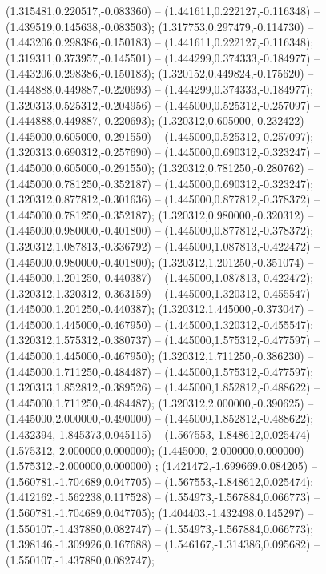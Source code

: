  (1.315481,0.220517,-0.083360) -- (1.441611,0.222127,-0.116348) -- (1.439519,0.145638,-0.083503);
 (1.317753,0.297479,-0.114730) -- (1.443206,0.298386,-0.150183) -- (1.441611,0.222127,-0.116348);
 (1.319311,0.373957,-0.145501) -- (1.444299,0.374333,-0.184977) -- (1.443206,0.298386,-0.150183);
 (1.320152,0.449824,-0.175620) -- (1.444888,0.449887,-0.220693) -- (1.444299,0.374333,-0.184977);
 (1.320313,0.525312,-0.204956) -- (1.445000,0.525312,-0.257097) -- (1.444888,0.449887,-0.220693);
 (1.320312,0.605000,-0.232422) -- (1.445000,0.605000,-0.291550) -- (1.445000,0.525312,-0.257097);
 (1.320313,0.690312,-0.257690) -- (1.445000,0.690312,-0.323247) -- (1.445000,0.605000,-0.291550);
 (1.320312,0.781250,-0.280762) -- (1.445000,0.781250,-0.352187) -- (1.445000,0.690312,-0.323247);
 (1.320312,0.877812,-0.301636) -- (1.445000,0.877812,-0.378372) -- (1.445000,0.781250,-0.352187);
 (1.320312,0.980000,-0.320312) -- (1.445000,0.980000,-0.401800) -- (1.445000,0.877812,-0.378372);
 (1.320312,1.087813,-0.336792) -- (1.445000,1.087813,-0.422472) -- (1.445000,0.980000,-0.401800);
 (1.320312,1.201250,-0.351074) -- (1.445000,1.201250,-0.440387) -- (1.445000,1.087813,-0.422472);
 (1.320312,1.320312,-0.363159) -- (1.445000,1.320312,-0.455547) -- (1.445000,1.201250,-0.440387);
 (1.320312,1.445000,-0.373047) -- (1.445000,1.445000,-0.467950) -- (1.445000,1.320312,-0.455547);
 (1.320312,1.575312,-0.380737) -- (1.445000,1.575312,-0.477597) -- (1.445000,1.445000,-0.467950);
 (1.320312,1.711250,-0.386230) -- (1.445000,1.711250,-0.484487) -- (1.445000,1.575312,-0.477597);
 (1.320313,1.852812,-0.389526) -- (1.445000,1.852812,-0.488622) -- (1.445000,1.711250,-0.484487);
 (1.320312,2.000000,-0.390625) -- (1.445000,2.000000,-0.490000) -- (1.445000,1.852812,-0.488622);
 (1.432394,-1.845373,0.045115) -- (1.567553,-1.848612,0.025474) -- (1.575312,-2.000000,0.000000);
 (1.445000,-2.000000,0.000000) -- (1.575312,-2.000000,0.000000) ;
 (1.421472,-1.699669,0.084205) -- (1.560781,-1.704689,0.047705) -- (1.567553,-1.848612,0.025474);
 (1.412162,-1.562238,0.117528) -- (1.554973,-1.567884,0.066773) -- (1.560781,-1.704689,0.047705);
 (1.404403,-1.432498,0.145297) -- (1.550107,-1.437880,0.082747) -- (1.554973,-1.567884,0.066773);
 (1.398146,-1.309926,0.167688) -- (1.546167,-1.314386,0.095682) -- (1.550107,-1.437880,0.082747);
